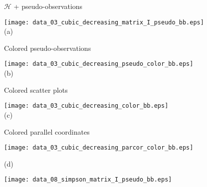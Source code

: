 \documentclass[journal]{vgtc}                %
\begin{document}
\begin{figure*}[ht!]
    \centering

  \begin{minipage}{0.23\textwidth}
   \centering
     $\mathcal{H}$ + pseudo-observations \\ \medskip

     \hspace{-0.35cm} \texttt{[image: data\_03\_cubic\_decreasing\_matrix\_I\_pseudo\_bb.eps]}\\

   \hspace{-0.56cm} \footnotesize (a) 
  \end{minipage}
  \hfill
  \begin{minipage}{0.23\textwidth}
   \centering
     Colored pseudo-observations \\ \medskip

     \texttt{[image: data\_03\_cubic\_decreasing\_pseudo\_color\_bb.eps]}\\

   \hspace{-0.31cm} \footnotesize (b) 
  \end{minipage}
  \hfill
  \begin{minipage}{0.27\textwidth}
   \centering
        Colored scatter plots \\ \medskip

     \texttt{[image: data\_03\_cubic\_decreasing\_color\_bb.eps]}\\

   \hspace{-0.18cm} \footnotesize (c) 
  \end{minipage}
  \hfill
  \begin{minipage}{0.20\textwidth}
   \centering
     Colored parallel coordinates\\ \medskip

     \texttt{[image: data\_03\_cubic\_decreasing\_parcor\_color\_bb.eps]}\\ \vspace{0.4cm}

   \hspace{-0.20cm} \footnotesize (d) 
  \end{minipage}
  
  \mbox{} \bigskip
  
  \begin{minipage}{0.23\textwidth}
   \centering

     \hspace{-0.3cm} \texttt{[image: data\_08\_simpson\_matrix\_I\_pseudo\_bb.eps]}\\


\end{minipage}
\end{figure*}
\end{document}
